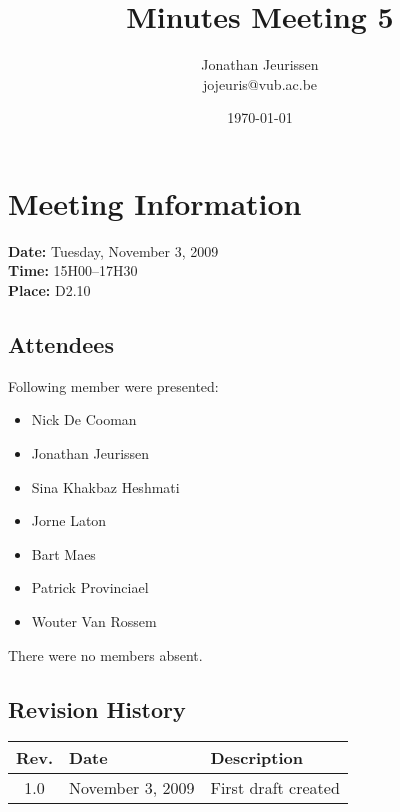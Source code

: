 \documentclass[a4paper, 12pt]{article}
\begin{document}
\title{Minutes Meeting 5}
\author{Jonathan Jeurissen \\ jojeuris@vub.ac.be}
\date{\today}

\maketitle	
	\section{Meeting Information}
			\textbf{Date:} Tuesday, November 3, 2009\\
			\textbf{Time:} 15H00--17H30\\
			\textbf{Place:} D2.10\\
		\subsection{Attendees}
Following member were presented:
			\begin{itemize}
				\item Nick De Cooman
				\item Jonathan Jeurissen
				\item Sina Khakbaz Heshmati
				\item Jorne Laton
				\item Bart Maes
				\item Patrick Provinciael
				\item Wouter Van Rossem
			\end{itemize}
There were no members absent.
		\subsection{Revision History}
			\begin{tabular}{c | l | l }
				\textbf{Rev.} & \textbf{Date} & \textbf{Description} \\
				\hline
				1.0 & November 3, 2009 & First draft created \\
			\end{tabular}		
\end{document}
